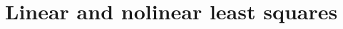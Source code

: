 \documentclass[12pt, leqno]{article} %
\begin{document}

\section{Linear and nolinear least squares}
\end{document}
